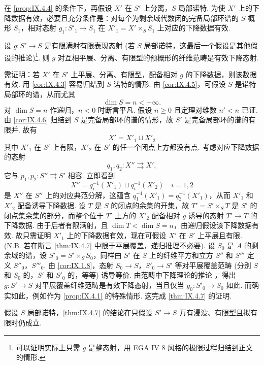 \begin{corollary}\label{cor:IX.4.6}
在 \ref{prop:IX.4.4} 的条件下，再假设 $X'$ 在 $S'$ 上分离，$S$ 局部诺特. 为使 $X'$ 上的下降数据有效，必要且充分条件是：对每个为剩余域代数闭的完备局部环谱的 $S$-概形 $S_1$，相对态射 $g_1 \colon S'_1 \to S_1$ 在 $X'_1 = X' \times_S S_1$ 上对应的下降数据有效.
\end{corollary}

\begin{theorem}\label{thm:IX.4.7}
设 $g \colon S' \to S$ 是有限满射有限表现态射 (若 $S$ 局部诺特，这最后一个假设是其他假设的推论)\footnote{可以证明实际上只需 $g$ 是整态射，用 EGA IV 8 风格的极限过程归结到正文的情形.}. 则 $g$ 对互相平展、分离、有限型的预概形的纤维范畴是有效下降态射.
\end{theorem}

需证明：若 $X'$ 在 $S'$ 上平展、分离、有限型，配备相对 $g$ 的下降数据，则该数据有效. 用 \ref{cor:IX.4.3} 容易归结到 $S$ 诺特的情形. 由 \ref{cor:IX.4.5}，可假设 $S$ 是诺特局部环的谱，从而尤其
\[
\dim S = n < +\infty.
\]
对 $\dim S = n$ 作递归，$n < 0$ 时断言平凡. 假设 $n \geqslant 0$ 且定理对维数 $n' < n$ 已证. 由 \ref{cor:IX.4.6} 归结到 $S$ 是完备局部环的谱的情形，故 $S'$ 是完备局部环的谱的有限并. 故有
\[
X' = X'_1 \sqcup X'_2
\]
其中 $X'_1$ 在 $S'$ 上有限，$X'_2$ 在 $S'$ 的任一个闭点上方都没有点. 考虑对应下降数据的态射
\[
q_1, q_2 \colon X'' \rightrightarrows X',
\]
它与 $p_1, p_2 \colon S'' \rightrightarrows S'$ 相容. 立即看到
\[
X'' = q_i^{-1}(X'_1) \sqcup q_i^{-1}(X'_2) \quad i = 1, 2
\]
是 $X''$ 在 $S''$ 上的对应典范分解，这蕴含 $q_1^{-1}(X'_1) = q_2^{-1}(X'_1)$，从而 $X'_1$ 和 $X'_2$ 配备诱导下降数据. 设 $T$ 是 $S$ 的闭点的余集的开集，故 $T' = S' \times_S T$ 是 $S'$ 的闭点集余集的部分，而整个位于 $T'$ 上方的 $X'_2$ 配备相对 $g$ 诱导的态射 $T' \to T$ 的下降数据. 由于后者有限满射，且 $\dim T < \dim S = n$，由递归假设该下降数据有效. 故只需证明 $X'_1$ 上的下降数据有效，现在可假设 $X'$ 在 $S'$ 上平展且有限. (N.B. 若在断言 \ref{thm:IX.4.7} 中限于平展覆盖，递归推理不必要). 设 $S_0$ 是 $A$ 的剩余域的谱，设 $S'_0 = S' \times_S S_0$，同样由 $S'$ 在 $S$ 上的纤维平方和立方 $S''$ 和 $S'''$ 定义 $S''_0$，$S'''_0$. 由 \ref{cor:IX.1.8}，态射 $S_0 \to S$，$S'_0 \to S'$ 等对平展覆盖范畴 (分别 $S$ 和 $S_0$ 的，$S'$ 和 $S'_0$ 的，等等) 诱导等价. 由范畴中下降理论的推论 \cite{exp09-D}，得出 $g \colon S' \to S$ 对平展覆盖纤维范畴是有效下降态射，当且仅当 $g_0 \colon S'_0 \to S_0$ 如此. 而确实如此，例如作为 \ref{prop:IX.4.1} 的特殊情形. 这完成 \ref{thm:IX.4.7} 的证明.

\begin{corollary}\label{cor:IX.4.8}
假设 $S$ 局部诺特，\ref{thm:IX.4.7} 的结论在只假设 $S' \to S$ 万有浸没、有限型且拟有限时仍成立.
\end{corollary}

